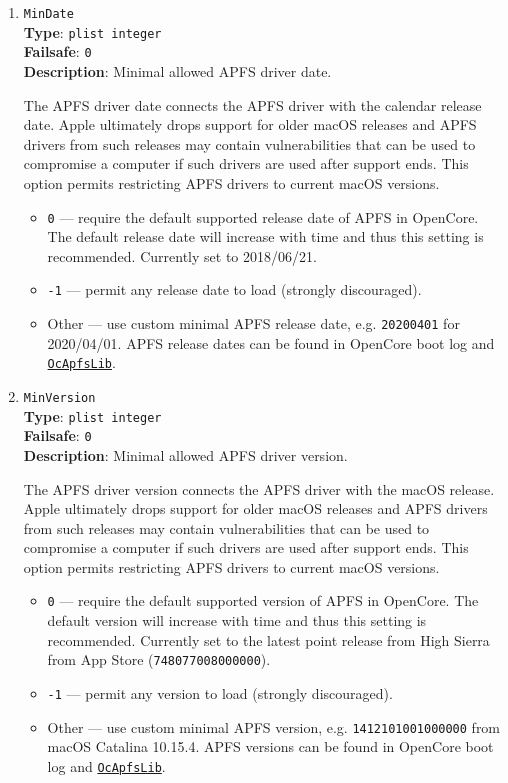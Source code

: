 \documentclass[]{article}
\providecommand{\tightlist}{%
  \setlength{\itemsep}{0pt}\setlength{\parskip}{0pt}}
\begin{document}
\begin{enumerate}
\item
  \texttt{MinDate}\\
  \textbf{Type}: \texttt{plist\ integer}\\
  \textbf{Failsafe}: \texttt{0}\\
  \textbf{Description}: Minimal allowed APFS driver date.

  The APFS driver date connects the APFS driver with the calendar release date.
  Apple ultimately drops support for older macOS releases and APFS drivers from
  such releases may contain vulnerabilities that can be used to compromise
  a computer if such drivers are used after support ends. This option
  permits restricting APFS drivers to current macOS versions.

  \begin{itemize}
    \tightlist
    \item \texttt{0} --- require the default supported release date of APFS
    in OpenCore. The default release date will increase with time and thus
    this setting is recommended. Currently set to 2018/06/21.
    \item \texttt{-1} --- permit any release date to load (strongly discouraged).
    \item Other --- use custom minimal APFS release date, e.g. \texttt{20200401}
    for 2020/04/01. APFS release dates can be found in OpenCore boot log
    and \href{https://github.com/acidanthera/OpenCorePkg/blob/master/Include/Acidanthera/Library/OcApfsLib.h}{\texttt{OcApfsLib}}.
  \end{itemize}

\item
  \texttt{MinVersion}\\
  \textbf{Type}: \texttt{plist\ integer}\\
  \textbf{Failsafe}: \texttt{0}\\
  \textbf{Description}: Minimal allowed APFS driver version.

  The APFS driver version connects the APFS driver with the macOS release.
  Apple ultimately drops support for older macOS releases and APFS drivers from
  such releases may contain vulnerabilities that can be used to compromise
  a computer if such drivers are used after support ends. This option
  permits restricting APFS drivers to current macOS versions.

  \begin{itemize}
    \tightlist
    \item \texttt{0} --- require the default supported version of APFS
    in OpenCore. The default version will increase with time and thus
    this setting is recommended. Currently set to the latest point release
    from High Sierra from App Store (\texttt{748077008000000}).
    \item \texttt{-1} --- permit any version to load (strongly discouraged).
    \item Other --- use custom minimal APFS version, e.g. \texttt{1412101001000000}
    from macOS Catalina 10.15.4. APFS versions can be found in OpenCore boot log
    and \href{https://github.com/acidanthera/OpenCorePkg/blob/master/Include/Acidanthera/Library/OcApfsLib.h}{\texttt{OcApfsLib}}.
  \end{itemize}


\end{enumerate}
\end{document}
